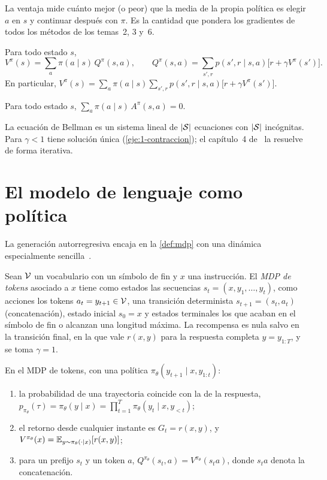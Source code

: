 La ventaja mide cuánto mejor (o peor) que la media de la propia política es elegir $a$ en $s$ y continuar después con $\pi$. Es la cantidad que pondera los gradientes de todos los métodos de los temas~2, 3 y~6.

\begin{teorema}\label{teo:bellman}
Para todo estado $s$,
\[
V^{\pi}(s)=\sum_{a}\pi(a\mid s)\,Q^{\pi}(s,a),\qquad Q^{\pi}(s,a)=\sum_{s',r}p(s',r\mid s,a)\bigl[r+\gamma V^{\pi}(s')\bigr].
\]
En particular, $V^{\pi}(s)=\sum_{a}\pi(a\mid s)\sum_{s',r}p(s',r\mid s,a)\bigl[r+\gamma V^{\pi}(s')\bigr]$.
\end{teorema}

\begin{corolario}\label{cor:ventaja-media}
Para todo estado $s$, $\displaystyle\sum_{a}\pi(a\mid s)\,A^{\pi}(s,a)=0$.
\end{corolario}

La ecuación de Bellman es un sistema lineal de $\lvert\mathcal{S}\rvert$ ecuaciones con $\lvert\mathcal{S}\rvert$ incógnitas. Para $\gamma<1$ tiene solución única (\cref{eje:1-contraccion}); el capítulo~4 de~\cite{sb} la resuelve de forma iterativa.

\section{El modelo de lenguaje como política}

La generación autorregresiva encaja en la \cref{def:mdp} con una dinámica especialmente sencilla~\cite{cs336}.

\begin{definicion}\label{def:mdp-tokens}
Sean $\mathcal{V}$ un vocabulario con un símbolo de fin y $x$ una instrucción. El \emph{MDP de tokens} asociado a $x$ tiene como estados las secuencias $s_t=(x,y_1,\dots,y_t)$, como acciones los tokens $a_t=y_{t+1}\in\mathcal{V}$, una transición determinista $s_{t+1}=(s_t,a_t)$ (concatenación), estado inicial $s_0=x$ y estados terminales los que acaban en el símbolo de fin o alcanzan una longitud máxima. La recompensa es nula salvo en la transición final, en la que vale $r(x,y)$ para la respuesta completa $y=y_{1:T}$, y se toma $\gamma=1$.
\end{definicion}

\begin{proposicion}\label{prop:mdp-tokens}
En el MDP de tokens, con una política $\pi_\theta(y_{t+1}\mid x,y_{1:t})$:
\begin{enumerate}
  \item la probabilidad de una trayectoria coincide con la de la respuesta, $p_{\pi_\theta}(\tau)=\pi_\theta(y\mid x)=\prod_{t=1}^{T}\pi_\theta(y_t\mid x,y_{<t})$;
  \item el retorno desde cualquier instante es $G_t=r(x,y)$, y $V^{\pi_\theta}(x)=\mathbb{E}_{y\sim\pi_\theta(\cdot\mid x)}[r(x,y)]$;
  \item para un prefijo $s_t$ y un token $a$, $Q^{\pi_\theta}(s_t,a)=V^{\pi_\theta}(s_t a)$, donde $s_t a$ denota la concatenación.
\end{enumerate}
\end{proposicion}

